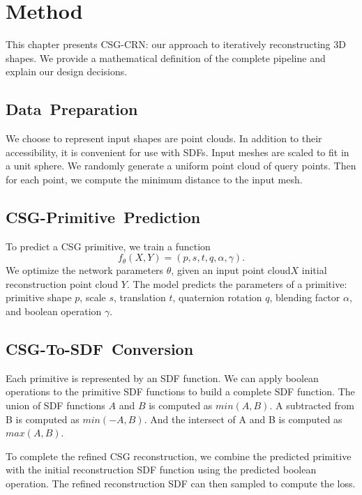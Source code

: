 
\chapter{Method}
\label{chap:method}

This chapter presents CSG-CRN: our approach to iteratively reconstructing 3D shapes. We provide a mathematical definition of the complete pipeline and explain our design decisions.


\section{Data~Preparation}
\label{sec:data_preparation}

We choose to represent input shapes are point clouds. In addition to their accessibility, it is convenient for use with SDFs. Input meshes are scaled to fit in a unit sphere. We randomly generate a uniform point cloud of query points. Then for each point, we compute the minimum distance to the input mesh. 


\section{CSG-Primitive~Prediction}
\label{sec:csg_primitive_prediction}

To predict a CSG primitive, we train a function
\[f_\theta (X, Y) = (p, s, t, q, \alpha, \gamma).\]
We optimize the network parameters $\theta$, given an input point cloud$X$ initial reconstruction point cloud $Y$. The model predicts the parameters of a primitive: primitive shape $p$, scale $s$, translation $t$, quaternion rotation $q$, blending factor $\alpha$, and boolean operation $\gamma$.


\section{CSG-To-SDF~Conversion}
\label{sec:csg_to_sdf_conversion}

Each primitive is represented by an SDF function. We can apply boolean operations to the primitive SDF functions to build a complete SDF function. The union of SDF functions $A$ and $B$ is computed as $min(A, B)$. A subtracted from B is computed as $min(-A, B)$. And the intersect of A and B is computed as $max(A, B)$.

To complete the refined CSG reconstruction, we combine the predicted primitive with the initial reconstruction SDF function using the predicted boolean operation. The refined reconstruction SDF can then sampled to compute the loss.


